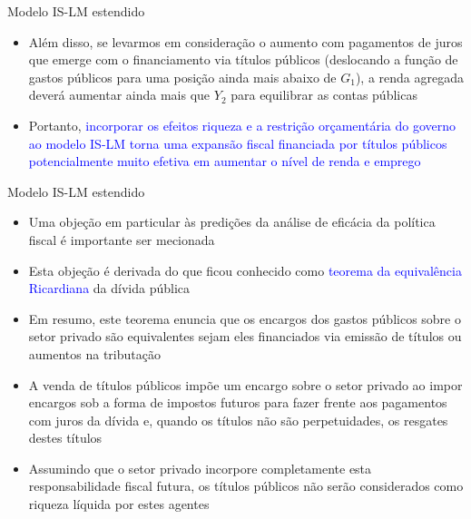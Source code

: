 \documentclass[10pt]{beamer}
\begin{document}
\begin{frame}{Modelo IS-LM estendido}
    \begin{itemize}
        \item Além disso, se levarmos em consideração o aumento com pagamentos de juros que emerge com o financiamento via títulos públicos (deslocando a função de gastos públicos para uma posição ainda mais abaixo de $G_1$), a renda agregada deverá aumentar ainda mais que $Y_2$ para equilibrar as contas públicas
        \bigskip
        \item Portanto, \textcolor{blue}{incorporar os efeitos riqueza e a restrição orçamentária do governo ao modelo IS-LM torna uma expansão fiscal financiada por títulos públicos potencialmente muito efetiva em aumentar o nível de renda e emprego}
    \end{itemize}
\end{frame}

\begin{frame}{Modelo IS-LM estendido}
    \begin{itemize}
        \item Uma objeção em particular às predições da análise de eficácia da política fiscal é importante ser mecionada
        \bigskip
        \item Esta objeção é derivada do que ficou conhecido como \textcolor{blue}{teorema da equivalência Ricardiana} da dívida pública
        \bigskip
        \item Em resumo, este teorema enuncia que os encargos dos gastos públicos sobre o setor privado são equivalentes sejam eles financiados via emissão de títulos ou aumentos na tributação
        \bigskip
        \item A venda de títulos públicos impõe um encargo sobre o setor privado ao impor encargos sob a forma de impostos futuros para fazer frente aos pagamentos com juros da dívida e, quando os títulos não são perpetuidades, os resgates destes títulos
        \bigskip
        \item Assumindo que o setor privado incorpore completamente esta responsabilidade fiscal futura, os títulos públicos não serão considerados como riqueza líquida por estes agentes
    \end{itemize}
\end{frame}
\end{document}
